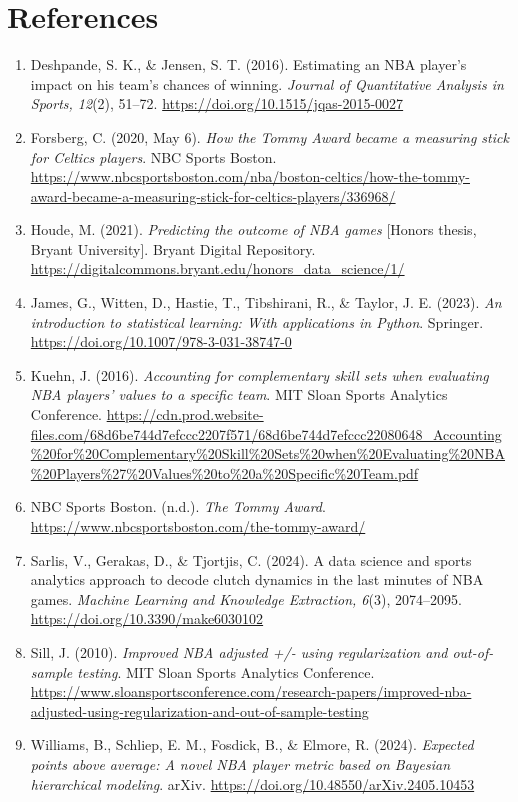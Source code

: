 \documentclass[11pt]{article}
\begin{document}
\section{References}
\begin{enumerate}
  \item Deshpande, S. K., \& Jensen, S. T. (2016). Estimating an NBA player's impact on his team's chances of winning. \textit{Journal of Quantitative Analysis in Sports, 12}(2), 51--72. \url{https://doi.org/10.1515/jqas-2015-0027}

  \item Forsberg, C. (2020, May 6). \textit{How the Tommy Award became a measuring stick for Celtics players}. NBC Sports Boston. \url{https://www.nbcsportsboston.com/nba/boston-celtics/how-the-tommy-award-became-a-measuring-stick-for-celtics-players/336968/}

  \item Houde, M. (2021). \textit{Predicting the outcome of NBA games} [Honors thesis, Bryant University]. Bryant Digital Repository. \url{https://digitalcommons.bryant.edu/honors_data_science/1/}

  \item James, G., Witten, D., Hastie, T., Tibshirani, R., \& Taylor, J. E. (2023). \textit{An introduction to statistical learning: With applications in Python}. Springer. \url{https://doi.org/10.1007/978-3-031-38747-0}

  \item Kuehn, J. (2016). \textit{Accounting for complementary skill sets when evaluating NBA players' values to a specific team}. MIT Sloan Sports Analytics Conference. \url{https://cdn.prod.website-files.com/68d6be744d7efccc2207f571/68d6be744d7efccc22080648_Accounting%20for%20Complementary%20Skill%20Sets%20when%20Evaluating%20NBA%20Players%27%20Values%20to%20a%20Specific%20Team.pdf}

  \item NBC Sports Boston. (n.d.). \textit{The Tommy Award}. \url{https://www.nbcsportsboston.com/the-tommy-award/}

  \item Sarlis, V., Gerakas, D., \& Tjortjis, C. (2024). A data science and sports analytics approach to decode clutch dynamics in the last minutes of NBA games. \textit{Machine Learning and Knowledge Extraction, 6}(3), 2074--2095. \url{https://doi.org/10.3390/make6030102}

  \item Sill, J. (2010). \textit{Improved NBA adjusted +/- using regularization and out-of-sample testing}. MIT Sloan Sports Analytics Conference. \url{https://www.sloansportsconference.com/research-papers/improved-nba-adjusted-using-regularization-and-out-of-sample-testing}

  \item Williams, B., Schliep, E. M., Fosdick, B., \& Elmore, R. (2024). \textit{Expected points above average: A novel NBA player metric based on Bayesian hierarchical modeling}. arXiv. \url{https://doi.org/10.48550/arXiv.2405.10453}
\end{enumerate}
\end{document}
